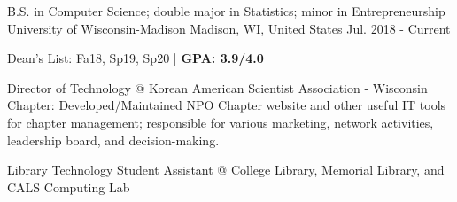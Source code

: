 

\begin{cventries}

  \cventry
  {B.S. in Computer Science; double major in Statistics; minor in Entrepreneurship} %
  {University of Wisconsin-Madison} %
  {Madison, WI, United States} %
  {Jul. 2018 - Current} %
  {
    \begin{cvitems} %
      \item {Dean's List: Fa18, Sp19, Sp20 | \textbf{GPA: 3.9/4.0}}
      \item {Director of Technology @ Korean American Scientist Association - Wisconsin Chapter: Developed/Maintained NPO Chapter website and other useful IT tools for chapter management; responsible for various marketing, network activities, leadership board, and decision-making.}
      \item {Library Technology Student Assistant @ College Library, Memorial Library, and CALS Computing Lab}
    \end{cvitems}
  }

\end{cventries}
